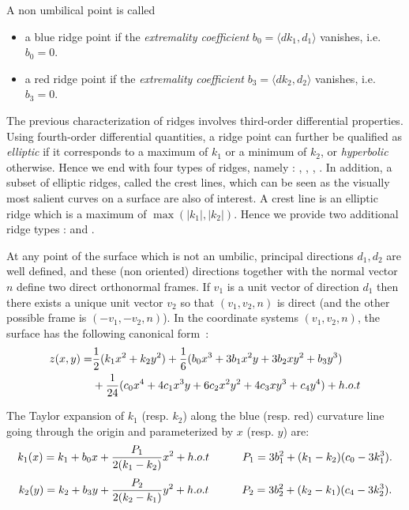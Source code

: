 \begin{definition}
\label{def:ridge-extrema}
A non umbilical point is called
\begin{itemize}
\item
a blue ridge point if the {\em extremality coefficient} $b_0=\langle
dk_1,d_1 \rangle$ vanishes, i.e. $b_0=0$.

\item
a red ridge point if the {\em extremality coefficient} $b_3=\langle
dk_2,d_2 \rangle$ vanishes, i.e. $b_3=0$.

\end{itemize}
\end{definition}

The previous characterization of ridges involves third-order
differential properties. Using fourth-order differential quantities, a
ridge point can further be qualified as {\em elliptic} if it
corresponds to a maximum of $k_1$ or a minimum of $k_2$, or {\em
hyperbolic} otherwise. Hence we end with four types of ridges, namely
: , , ,
.
In addition, a subset of elliptic ridges, called the crest lines,
which can be seen as the visually most salient curves on a surface are
also of interest. A crest line is an elliptic ridge which is a maximum
of $\max(|k_1|,|k_2|)$. Hence we provide two additional ridge types :
 and .



At any point of the surface which is not an umbilic, principal
directions $d_1, d_2$ are well defined, and these (non oriented)
directions together with the normal vector $n$ define two direct
orthonormal frames. If $v_1$ is a unit vector of direction $d_1$ then
there exists a unique unit vector $v_2$ so that $(v_1,v_2,n)$ is
direct (and the other possible frame is $(-v_1,-v_2,n)$). In the
coordinate systems $(v_1,v_2,n)$, the surface has the following
canonical form~:
%
\begin{eqnarray}
\label{eq:monge}
z(x,y) =  & \frac{1}{2}(k_1x^2 + k_2y^2)+
	\frac{1}{6}(b_0x^3+3b_1x^2y+3b_2xy^2+b_3y^3) \\
  &  +\frac{1}{24}(c_0x^4+4c_1x^3y+6c_2x^2y^2+4c_3xy^3+c_4y^4) + h.o.t
\end{eqnarray}

\noindent The Taylor expansion of $k_1$ (resp. $k_2$) along the blue
(resp. red) curvature line going through the origin and parameterized
by $x$ (resp. $y$) are:
\begin{equation}
\label{eq:taylor_along_line}
k_1(x) = k_1 + b_0x + \frac{P_1}{2(k_1-k_2)}x^2 +h.o.t \quad \quad \quad 
P_1= 3b_1^2+(k_1-k_2)(c_0-3k_1^3).
\end{equation}
%
\begin{equation}
\label{eq:taylor_along_red_line}
k_2(y) = k_2 + b_3y + \frac{P_2}{2(k_2-k_1)}y^2 +h.o.t \quad \quad \quad 
P_2= 3b_2^2+(k_2-k_1)(c_4-3k_2^3).
\end{equation}

